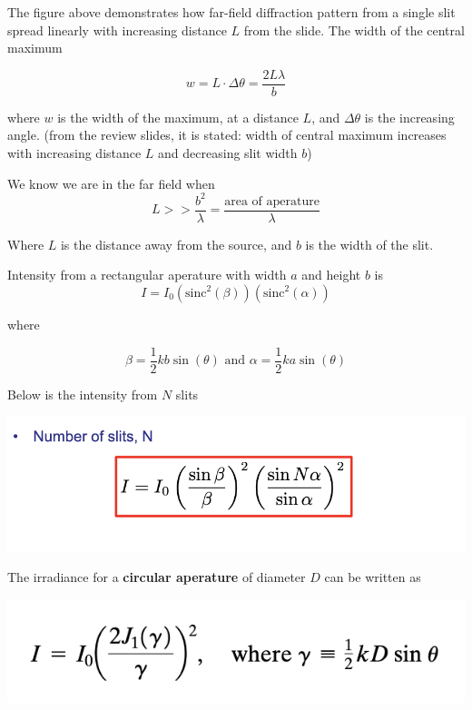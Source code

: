 \documentclass[10pt]{article}
\begin{document}
The figure above demonstrates how far-field diffraction pattern from a single slit spread linearly with increasing distance $L$ from the slide. The width of the central maximum

\[w = L \cdot \Delta \theta = \frac{2L \lambda}{b}\]

where $w$ is the width of the maximum, at a distance $L$, and $\Delta \theta$ is the increasing angle. (from the review slides, it is stated: width of central maximum increases with increasing distance $L$ and decreasing slit width $b$)

\newblock

We know we are in the far field when 
\[L >> \frac{b^2}{\lambda} = \frac{\text{area of aperature}}{\lambda}\]

Where $L$ is the distance away from the source, and $b$ is the width of the slit.

\newpage

Intensity from a rectangular aperature with width $a$ and height $b$ is
\[I = I_0(\text{sinc}^2(\beta))(\text{sinc}^2(\alpha))\]
\begin{center}
    where
\end{center}

\[\beta = \frac{1}{2}kb\sin(\theta) \text{ and } \alpha = \frac{1}{2}ka\sin(\theta)\]

Below is the intensity from $N$ slits

\begin{center}
    \includegraphics*[scale = .6]{imgs/intensity-due-to-n-slits.png}
\end{center}

The irradiance for a \textbf{circular aperature} of diameter $D$ can be written as 

\begin{center}
    \includegraphics*[scale = .8]{imgs/intesity-from-circ-app.png}
\end{center}
\end{document}
